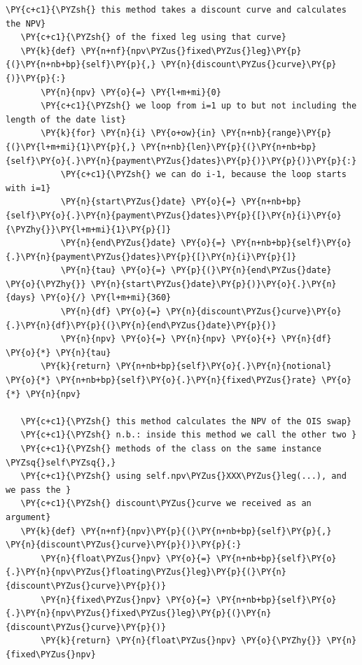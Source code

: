 \begin{Verbatim}[commandchars=\\\{\}]
   \PY{c+c1}{\PYZsh{} this method takes a discount curve and calculates the NPV}
   \PY{c+c1}{\PYZsh{} of the fixed leg using that curve}
   \PY{k}{def} \PY{n+nf}{npv\PYZus{}fixed\PYZus{}leg}\PY{p}{(}\PY{n+nb+bp}{self}\PY{p}{,} \PY{n}{discount\PYZus{}curve}\PY{p}{)}\PY{p}{:}
       \PY{n}{npv} \PY{o}{=} \PY{l+m+mi}{0}
       \PY{c+c1}{\PYZsh{} we loop from i=1 up to but not including the length of the date list}
       \PY{k}{for} \PY{n}{i} \PY{o+ow}{in} \PY{n+nb}{range}\PY{p}{(}\PY{l+m+mi}{1}\PY{p}{,} \PY{n+nb}{len}\PY{p}{(}\PY{n+nb+bp}{self}\PY{o}{.}\PY{n}{payment\PYZus{}dates}\PY{p}{)}\PY{p}{)}\PY{p}{:} 
           \PY{c+c1}{\PYZsh{} we can do i-1, because the loop starts with i=1}
           \PY{n}{start\PYZus{}date} \PY{o}{=} \PY{n+nb+bp}{self}\PY{o}{.}\PY{n}{payment\PYZus{}dates}\PY{p}{[}\PY{n}{i}\PY{o}{\PYZhy{}}\PY{l+m+mi}{1}\PY{p}{]} 
           \PY{n}{end\PYZus{}date} \PY{o}{=} \PY{n+nb+bp}{self}\PY{o}{.}\PY{n}{payment\PYZus{}dates}\PY{p}{[}\PY{n}{i}\PY{p}{]}
           \PY{n}{tau} \PY{o}{=} \PY{p}{(}\PY{n}{end\PYZus{}date} \PY{o}{\PYZhy{}} \PY{n}{start\PYZus{}date}\PY{p}{)}\PY{o}{.}\PY{n}{days} \PY{o}{/} \PY{l+m+mi}{360}
           \PY{n}{df} \PY{o}{=} \PY{n}{discount\PYZus{}curve}\PY{o}{.}\PY{n}{df}\PY{p}{(}\PY{n}{end\PYZus{}date}\PY{p}{)}
           \PY{n}{npv} \PY{o}{=} \PY{n}{npv} \PY{o}{+} \PY{n}{df} \PY{o}{*} \PY{n}{tau}
       \PY{k}{return} \PY{n+nb+bp}{self}\PY{o}{.}\PY{n}{notional} \PY{o}{*} \PY{n+nb+bp}{self}\PY{o}{.}\PY{n}{fixed\PYZus{}rate} \PY{o}{*} \PY{n}{npv}
   
   \PY{c+c1}{\PYZsh{} this method calculates the NPV of the OIS swap}
   \PY{c+c1}{\PYZsh{} n.b.: inside this method we call the other two }
   \PY{c+c1}{\PYZsh{} methods of the class on the same instance \PYZsq{}self\PYZsq{},}
   \PY{c+c1}{\PYZsh{} using self.npv\PYZus{}XXX\PYZus{}leg(...), and we pass the }
   \PY{c+c1}{\PYZsh{} discount\PYZus{}curve we received as an argument}
   \PY{k}{def} \PY{n+nf}{npv}\PY{p}{(}\PY{n+nb+bp}{self}\PY{p}{,} \PY{n}{discount\PYZus{}curve}\PY{p}{)}\PY{p}{:}
       \PY{n}{float\PYZus{}npv} \PY{o}{=} \PY{n+nb+bp}{self}\PY{o}{.}\PY{n}{npv\PYZus{}floating\PYZus{}leg}\PY{p}{(}\PY{n}{discount\PYZus{}curve}\PY{p}{)}
       \PY{n}{fixed\PYZus{}npv} \PY{o}{=} \PY{n+nb+bp}{self}\PY{o}{.}\PY{n}{npv\PYZus{}fixed\PYZus{}leg}\PY{p}{(}\PY{n}{discount\PYZus{}curve}\PY{p}{)}
       \PY{k}{return} \PY{n}{float\PYZus{}npv} \PY{o}{\PYZhy{}} \PY{n}{fixed\PYZus{}npv}
\end{Verbatim}


